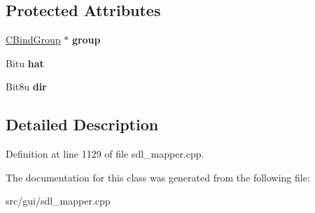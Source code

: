 \subsection*{Protected Attributes}
\begin{DoxyCompactItemize}
\item 
\hypertarget{classCJHatBind_a29b7138a9094d140fad3bb6bef01b3e2}{\hyperlink{classCBindGroup}{C\-Bind\-Group} $\ast$ {\bfseries group}}\label{classCJHatBind_a29b7138a9094d140fad3bb6bef01b3e2}

\item 
\hypertarget{classCJHatBind_a652e1ca02ee3c415917d41bd557a25ba}{Bitu {\bfseries hat}}\label{classCJHatBind_a652e1ca02ee3c415917d41bd557a25ba}

\item 
\hypertarget{classCJHatBind_a2b02bbb8de4fc7bb9941f535254dad19}{Bit8u {\bfseries dir}}\label{classCJHatBind_a2b02bbb8de4fc7bb9941f535254dad19}

\end{DoxyCompactItemize}


\subsection{Detailed Description}


Definition at line 1129 of file sdl\-\_\-mapper.\-cpp.



The documentation for this class was generated from the following file\-:\begin{DoxyCompactItemize}
\item 
src/gui/sdl\-\_\-mapper.\-cpp\end{DoxyCompactItemize}
